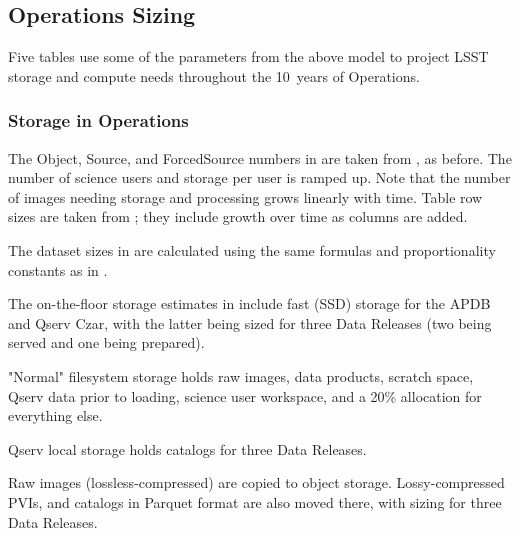 


\subsection{Operations Sizing}

Five tables use some of the parameters from the above model to project LSST storage and compute needs throughout the 10~years of Operations.

\subsubsection{Storage in Operations}

\afterpage{
  \clearpage
  \begin{landscape}
      
      
  \end{landscape}
  \clearpage
}

The Object, Source, and ForcedSource numbers in  are taken from , as before.
The number of science users and storage per user is ramped up.
Note that the number of images needing storage and processing grows linearly with time.
Table row sizes are taken from ; they include growth over time as columns are added.

The dataset sizes in  are calculated using the same formulas and proportionality constants as in .

\afterpage{
  \clearpage
  \begin{landscape}
      
      
      
  \end{landscape}
  \clearpage
}

The on-the-floor storage estimates in  include fast (SSD) storage for the APDB and Qserv Czar, with the latter being sized for three Data Releases (two being served and one being prepared).

"Normal" filesystem storage holds raw images, data products, scratch space, Qserv data prior to loading, science user workspace, and a 20\% allocation for everything else.

Qserv local storage holds catalogs for three Data Releases.

Raw images (lossless-compressed) are copied to object storage.
Lossy-compressed PVIs, and catalogs in Parquet format are also moved there, with sizing for three Data Releases.

